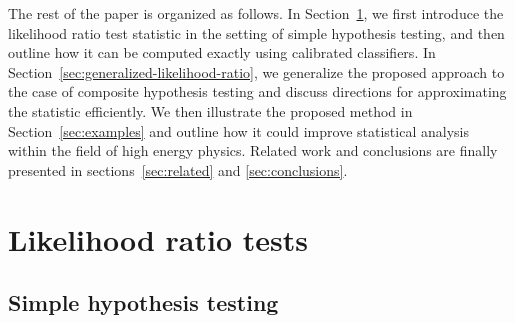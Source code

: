 \documentclass[12pt]{article}
\numberwithin{equation}{section}
\theoremstyle{plain}
\begin{document}
The rest of the paper is organized as follows. In
Section~\ref{sec:likelihood-ratio-tests}, we first introduce the likelihood
ratio test statistic in the setting of simple hypothesis testing, and then
outline how it can be computed exactly using calibrated classifiers.
In Section~\ref{sec:generalized-likelihood-ratio}, we generalize the proposed
approach to the case of composite hypothesis testing and discuss directions for
approximating the statistic efficiently. We then illustrate the proposed
method in Section~\ref{sec:examples} and outline how it could improve
statistical analysis within the field of high energy physics. Related work
and conclusions are finally presented in sections~\ref{sec:related} and \ref{sec:conclusions}.





\section{Likelihood ratio tests}
\label{sec:likelihood-ratio-tests}

\subsection{Simple hypothesis testing}

%
\end{document}
